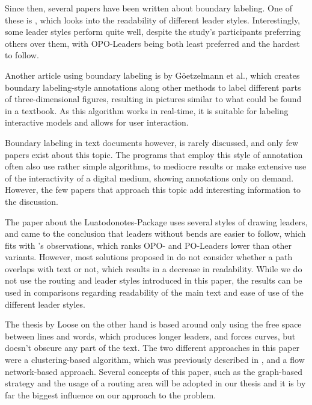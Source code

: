 \documentclass[11pt,a4paper]{vutinfth}
\begin{document}
Since then, several papers have been written about boundary labeling. One of these is \cite{Barth2015}, which looks into the readability of different leader styles. Interestingly, some leader styles perform quite well, despite the study's participants preferring others over them, with OPO-Leaders being both least preferred and the hardest to follow.

Another article using boundary labeling is \cite{Goetzelmann2006} by G{\"o}etzelmann et al., which creates boundary labeling-style annotations along other methods to label different parts of three-dimensional figures, resulting in pictures similar to what could be found in a textbook. As this algorithm works in real-time, it is suitable for labeling interactive models and allows for user interaction.


Boundary labeling in text documents however, is rarely discussed, and only few papers exist about this topic. The programs that employ this style of annotation often also use rather simple algorithms, to mediocre results or make extensive use of the interactivity of a digital medium, showing annotations only on demand. However, the few papers that approach this topic add interesting information to the discussion.

The paper about the Luatodonotes-Package\cite{Kindermann2014} uses several styles of drawing leaders, and came to the conclusion that leaders without bends are easier to follow, which fits with \cite{Barth2015}'s observations, which ranks OPO- and PO-Leaders lower than other variants.
However, most solutions proposed in \cite{Kindermann2014} do not consider whether a path overlaps with text or not, which results in a decrease in readability. While we do not use the routing and leader styles introduced in this paper, the results can be used in comparisons regarding readability of the main text and ease of use of the different leader styles.%

The thesis by Loose\cite{Loose2015} on the other hand is based around only using the free space between lines and words, which produces longer leaders, and forces curves, but doesn't obscure any part of the text. The two different approaches in this paper were a clustering-based algorithm, which was previously described in \cite{Nollenburg2010}, and a flow network-based approach. Several concepts of this paper, such as the graph-based strategy and the usage of a routing area will be adopted in our thesis and it is by far the biggest influence on our approach to the problem.  %
\end{document}
